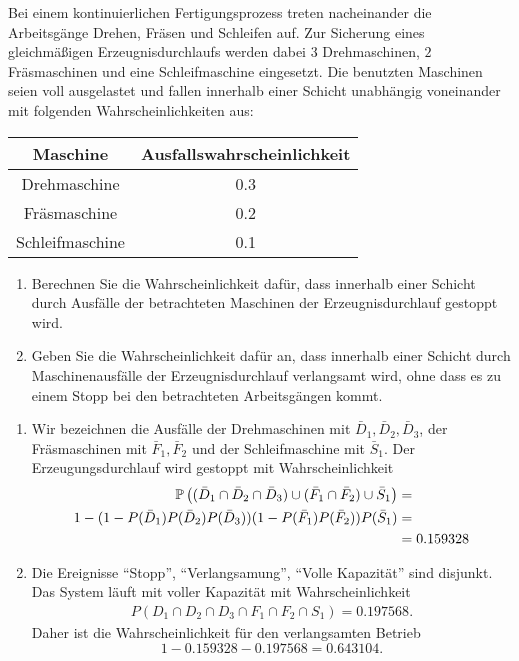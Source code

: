 Bei einem kontinuierlichen Fertigungsprozess treten nacheinander die
Arbeits\-gän\-ge Drehen, Fräsen und Schleifen auf. Zur Sicherung eines
gleichmäßigen Erzeugnisdurchlaufs werden dabei $3$ Drehmaschinen, $2$ Fräsmaschinen
und eine Schleifmaschine eingesetzt. Die benutzten Maschinen seien voll
ausgelastet und fallen innerhalb einer Schicht unabhängig voneinander mit
folgenden Wahrscheinlichkeiten aus:
\begin{center}
\begin{tabular}{c|c}
Maschine& Ausfallswahrscheinlichkeit \\ \hline
Drehmaschine & 0.3 \\
Fräsmaschine & 0.2 \\
Schleifmaschine & 0.1
\end{tabular}
\end{center}
\begin{enumerate}
\item Berechnen Sie die Wahrscheinlichkeit dafür, dass innerhalb einer Schicht
    durch Ausfälle der betrachteten Maschinen der Erzeugnisdurchlauf gestoppt
    wird.
\item Geben Sie die Wahrscheinlichkeit dafür an, dass innerhalb einer Schicht
    durch Maschinenausfälle der Erzeugnisdurchlauf verlangsamt wird, ohne dass
    es zu einem Stopp bei den betrachteten Arbeitsgängen kommt.
\end{enumerate}

\solution
\begin{enumerate}
    \item Wir bezeichnen die Ausfälle der Drehmaschinen mit $\bar D_1, \bar
        D_2, \bar D_3$, der Fräsmaschinen mit $\bar F_1, \bar F_2$ und der
        Schleifmaschine mit $\bar S_1$. Der Erzeugungsdurchlauf wird gestoppt
        mit Wahrscheinlichkeit
        \begin{align*}
            \mathbb P \left( (\bar D_1 \cap \bar D_2 \cap \bar D_3 ) \cup ( \bar F_1 \cap \bar F_2) \cup \bar S_1 \right) &=  \\
            1 - ( 1 - P(\bar D_1)P(\bar D_2)P(\bar D_3))(1- P(\bar F_1)P(\bar F_2))P(\bar S_1) &= \\
            &= 0.159328
        \end{align*}
    \item Die Ereignisse ``Stopp'', ``Verlangsamung'', ``Volle Kapazität'' sind disjunkt. 
        Das System läuft mit voller Kapazität mit Wahrscheinlichkeit
        \begin{align*}
            P( D_1 \cap D_2 \cap D_3 \cap F_1 \cap F_2 \cap S_1 ) = 0.197568.
        \end{align*}
        Daher ist die Wahrscheinlichkeit für den verlangsamten Betrieb
        \begin{equation*}
            1 - 0.159328 - 0.197568 = 0.643104.
        \end{equation*}
\end{enumerate} 

